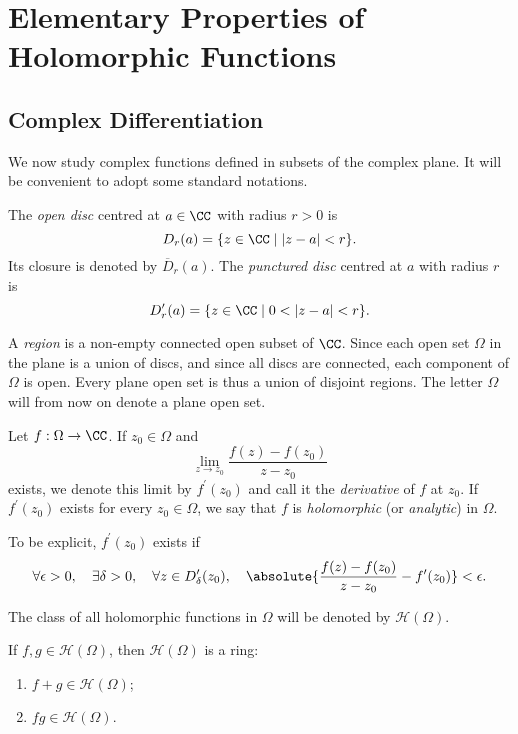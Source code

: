 \chapter{Elementary Properties of Holomorphic Functions}\label{chap:elementary-properties-holomorphic-functions}
\section{Complex Differentiation}
We now study complex functions defined in subsets of the complex plane. It will be convenient to adopt some standard notations.

The \emph{open disc} centred at $a\in\CC$ with radius $r>0$ is
\[D_r(a)=\{z\in\CC\mid |z-a|<r\}.\]
Its closure is denoted by $\overline{D}_r(a)$. The \emph{punctured disc} centred at $a$ with radius $r$ is
\[D_r^\prime(a)=\{z\in\CC\mid 0<|z-a|<r\}.\]

A \emph{region} is a non-empty connected open subset of $\CC$. Since each open set $\Omega$ in the plane is a union of discs, and since all discs are connected, each component of $\Omega$ is open. Every plane open set is thus a union of disjoint regions. The letter $\Omega$ will from now on denote a plane open set. 

\begin{definition}
Let $f:\Omega\to\CC$. If $z_0\in\Omega$ and
\[\lim_{z\to z_0}\frac{f(z)-f(z_0)}{z-z_0}\]
exists, we denote this limit by $f^\prime(z_0)$ and call it the \emph{derivative} of $f$ at $z_0$. If $f^\prime(z_0)$ exists for every $z_0\in\Omega$, we say that $f$ is \emph{holomorphic} (or \emph{analytic}) in $\Omega$. 
\end{definition}

To be explicit, $f^\prime(z_0)$ exists if
\[\forall\epsilon>0,\quad\exists\delta>0,\quad\forall z\in D_\delta^\prime(z_0),\quad\absolute{\frac{f(z)-f(z_0)}{z-z_0}-f^\prime(z_0)}<\epsilon.\]

\begin{notation}
The class of all holomorphic functions in $\Omega$ will be denoted by $\mathcal{H}(\Omega)$.
\end{notation}

\begin{lemma}
If $f,g\in\mathcal{H}(\Omega)$, then $\mathcal{H}(\Omega)$ is a ring:
\begin{enumerate}[label=(\roman*)]
\item $f+g\in\mathcal{H}(\Omega)$;
\item $fg\in\mathcal{H}(\Omega)$.
\end{enumerate}
\end{lemma}

